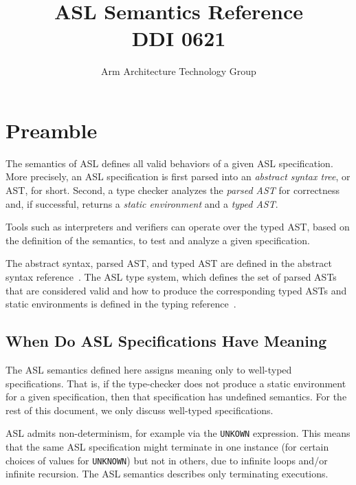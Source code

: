 \documentclass{book}
\author{Arm Architecture Technology Group}
\title{ASL Semantics Reference \\
       DDI 0621}
\begin{document}
\maketitle

\tableofcontents{}





\chapter{Preamble}

The semantics of ASL defines all valid behaviors of a given ASL specification.
More precisely, an ASL specification is first parsed into an \emph{abstract syntax tree},
or AST, for short. Second, a type checker analyzes the \emph{parsed AST} for correctness and,
if successful, returns a \emph{static environment} and a \emph{typed AST}.

Tools such as interpreters and verifiers can operate over the typed AST, based on the definition
of the semantics, to test and analyze a given specification.

The abstract syntax, parsed AST, and typed AST are defined in the abstract syntax reference~\cite{ASLAbstractSyntaxReference}.
The ASL type system, which defines the set of parsed ASTs that are considered valid and how to
produce the corresponding typed ASTs and static environments is defined in the typing reference~\cite{ASLTypingReference}.

\section{When Do ASL Specifications Have Meaning \label{sec:MeaningfulASLSpecifications}}
The ASL semantics defined here assigns meaning only to well-typed specifications.
That is, if the type-checker does not produce a static environment for a given specification,
then that specification has undefined semantics.
For the rest of this document, we only discuss well-typed specifications.

ASL admits non-determinism, for example via the \texttt{UNKOWN} expression.
This means that the same ASL specification might terminate in one instance
(for certain choices of values for \texttt{UNKNOWN}) but not in others,
due to infinite loops and/or infinite recursion.
The ASL semantics describes only terminating executions.
\end{document}

